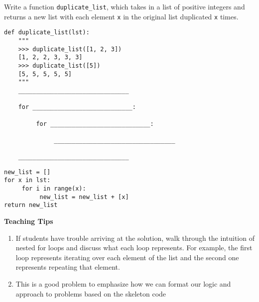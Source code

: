 \begin{blocksection}
\question Write a function \lstinline{duplicate_list}, which takes in a list of positive integers and returns a new list with each element \lstinline{x} in the original list duplicated \lstinline{x} times.

\begin{lstlisting}
def duplicate_list(lst):
    """
    >>> duplicate_list([1, 2, 3])
    [1, 2, 2, 3, 3, 3]
    >>> duplicate_list([5])
    [5, 5, 5, 5, 5]
    """
    _______________________________
    
    for ____________________________:

         for ____________________________:

              __________________________________

    _______________________________

\end{lstlisting}

\begin{solution}
\begin{lstlisting}
new_list = []
for x in lst:
     for i in range(x):
          new_list = new_list + [x]
return new_list
\end{lstlisting}
\end{solution}
\end{blocksection}

\begin{meta}
\textbf{Teaching Tips}
    \begin{enumerate}
            \item If students have trouble arriving at the solution, walk through the intuition of nested for loops
            and discuss what each loop represents. For example, the first loop represents iterating over each element
            of the list and the second one represents repeating that element.
            \item This is a good problem to emphasize how we can format our logic and approach to problems based on 
            the skeleton code
    \end{enumerate}
\end{meta}

